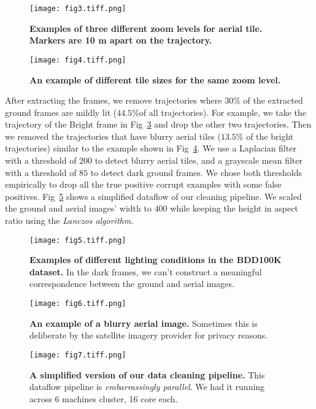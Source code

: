 \documentclass[10pt,letterpaper]{article}
\begin{document}
\begin{figure}[!ht]
  \caption{{\bf Examples of three different zoom levels for aerial tile. Markers are 10 m apart on the trajectory.}}
  \texttt{[image: fig3.tiff.png]}
  \label{fig3}
\end{figure}

\begin{figure}[!ht]
  \caption{{\bf An example of different tile sizes for the same zoom level.}}
  \texttt{[image: fig4.tiff.png]}

  \label{fig4}
\end{figure}

After extracting the frames, we remove trajectories where 30\% of the extracted ground frames are mildly lit ($44.5\%$of all trajectories). For example, we take the trajectory of the Bright frame in Fig~\ref{fig5} and drop the other two trajectories. Then we removed the trajectories that have blurry aerial tiles ($13.5\%$ of the bright trajectories) similar to the example shown in Fig~\ref{fig6}. We use a Laplacian filter~\cite{bib11} with a threshold of $200$ to detect blurry aerial tiles, and a grayscale mean filter with a threshold of $85$ to detect dark ground frames. We chose both thresholds empirically to drop all the true positive corrupt examples with some false positives. Fig~\ref{fig7} shows a simplified dataflow of our cleaning pipeline. We scaled the ground and aerial images’ width to $400$ while keeping the height in aspect ratio using the \emph{Lanczos algorithm}.

\begin{figure}[!ht]
  \caption{{\bf Examples of different lighting conditions in the BDD100K dataset.} In the dark frames, we can't construct a meaningful correspondence between the ground and aerial images.}
  \texttt{[image: fig5.tiff.png]}

  \label{fig5}
\end{figure}

\begin{figure}[!ht]
  \caption{{\bf An example of a blurry aerial image.} Sometimes this is deliberate by the satellite imagery provider for privacy reasons.}
  \texttt{[image: fig6.tiff.png]}

  \label{fig6}
\end{figure}

\begin{figure}[!ht]
  \caption{{\bf A simplified version of our data cleaning pipeline.} This dataflow pipeline is \emph{embarrassingly parallel}. We had it running across 6 machines cluster, 16 core each.}
  \texttt{[image: fig7.tiff.png]}
  \label{fig7}
\end{figure}
\end{document}
